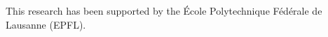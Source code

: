 

\begin{acknowledgements}
  This research has been supported by the \'Ecole Polytechnique F\'ed\'erale de Lausanne (EPFL).
\end{acknowledgements}


%
%




